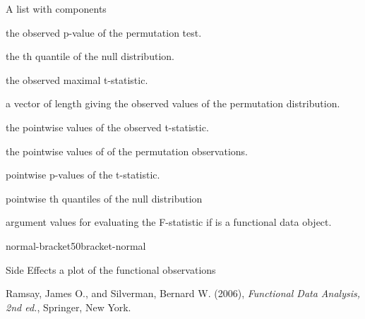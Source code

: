 \documentclass{article}
\begin{document}
\begin{Value}
A list with components
\begin{ldescription}
\item[\code{pval}] the observed p-value of the permutation test.
\item[\code{qval}] the th quantile of the null distribution.
\item[\code{Tobs}] the observed maximal t-statistic.
\item[\code{Tnull}] a vector of length  giving the observed values of the
permutation distribution.

\item[\code{Tvals}] the pointwise values of the observed t-statistic.
\item[\code{Tnullvals}] the pointwise values of of the permutation observations.
\item[\code{pvals.pts}] pointwise p-values of the t-statistic.
\item[\code{qvals.pts}] pointwise th quantiles of the null distribution
\item[\code{argvals}] argument values for evaluating the F-statistic if is
a functional data object.

\end{ldescription}

normal-bracket50bracket-normal
\end{Value}
\begin{Section}{Side Effects}
a plot of the functional observations
\end{Section}
\begin{Source}\relax
Ramsay, James O., and Silverman, Bernard W. (2006), \emph{Functional
Data Analysis, 2nd ed.}, Springer, New York.
\end{Source}
\begin{SeeAlso}\relax
{}
\end{SeeAlso}
\begin{Examples}
\end{Examples}
\end{document}
